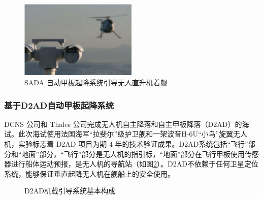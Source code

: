 \begin{figure}[!tb]   
	\centering	
	\includegraphics[width=0.5\textwidth]{Figs/24_SADA_Landing.jpg}
	\caption{SADA 自动甲板起降系统引导无人直升机着舰 }
	\label{fig:24_SADA_Landing}
\end{figure}


\subsubsection{基于D2AD自动甲板起降系统}
DCNS 公司和 Thales 公司完成无人机自主降落和自主甲板降落（D2AD）的海试。此次海试使用法国海军“拉斐尔”级护卫舰和一架波音H-6U“小鸟”旋翼无人机，实验标志着 D2AD 项目为期 4 年的技术验证成果。D2AD系统包括“飞行”部分和“地面”部分，“飞行”部分是无人机的指引标，“地面”部分在飞行甲板使用传感器进行船体运动预报，是无人机的导航站（如图\ref{fig:25_D2AD}）。D2AD不依赖于任何卫星定位系统，能够保证垂直起降无人机在舰船上的安全使用。

\begin{figure}[htb]
	\centering%
	\hspace{0.1em}%
	\hspace{0.1em}
	\caption{D2AD机载引导系统基本构成}
	\label{fig:25_D2AD}
\end{figure}

